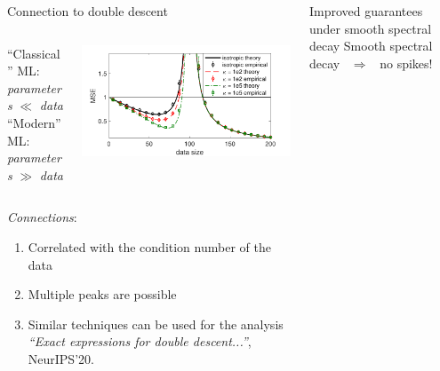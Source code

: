 \documentclass{beamer}
\begin{document}
\begin{frame}
\begin{columns}
\begin{column}{0.32\textwidth}
\begin{block}{Connection to double descent}
  \begin{columns}
    \begin{column}{.6\textwidth}
      ``Classical'' ML: \hfill\textit{parameters} $\ll$ \textit{data}\\
    ``Modern'' ML: \hfill \textit{parameters} $\gg$ \textit{data}
\end{column}
\begin{column}{.35\textwidth}
\includegraphics[width=\textwidth]{figs/descent-intro-nice}
\end{column}
\end{columns}
\vspace{1cm}

\emph{Connections}:
\begin{enumerate}
\item Correlated with the condition number of the data \cite{double-descent-condition}
\item Multiple peaks are possible
  \cite{liang2020multiple,BLLT19_TR}
\item  Similar techniques can be used for the analysis \cite{surrogate-design}\\[-1mm]
{  \footnotesize\textit{``Exact expressions for
    double descent...''}, NeurIPS'20.}
\end{enumerate}
\vspace{5mm}
  
\end{block}



\end{column}


\begin{column}{.32\textwidth}


\begin{block}{Improved guarantees under smooth spectral decay}
Smooth spectral decay \ $\Longrightarrow$ \ no spikes!
\vspace{5mm}


\end{block}
\end{column}
\end{columns}
\end{frame}
\end{document}
